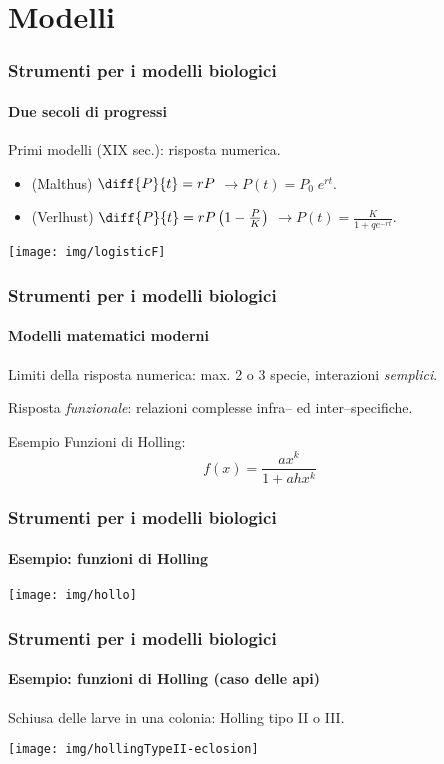 \documentclass[]{beamer}
\begin{document}
\section{Modelli}
\begin{frame}
    \frametitle{Strumenti per i modelli biologici}
    \framesubtitle{Due secoli di progressi}

    Primi modelli (XIX sec.): risposta numerica.
    \begin{itemize}
        \item (Malthus) $\diff{P}{t} = rP$ \pause \quad $\rightarrow P(t) = P_0 \; e^{rt}$.
        \item (Verlhust) $\diff{P}{t} = rP \left( 1 - \frac{P}{K} \right)$
            \pause \quad $\rightarrow P(t) = \frac{K}{1+qe^{-rt}}$.
    \end{itemize}

    \pause
    \begin{center}
        \texttt{[image: img/logisticF]}
    \end{center}
\end{frame}


\begin{frame}
    \frametitle{Strumenti per i modelli biologici}
    \framesubtitle{Modelli matematici moderni}

    Limiti della risposta numerica: max. 2 o 3 specie, interazioni \emph{semplici}.

    \pause
    Risposta \emph{funzionale}: relazioni complesse infra-- ed inter--specifiche.

    \pause
    \begin{exampleblock}{Esempio}
        Funzioni di Holling: $$f(x) = \frac{a x^k}{1 + a h x^k}$$
    \end{exampleblock}
\end{frame}

\begin{frame}
    \frametitle{Strumenti per i modelli biologici}
    \framesubtitle{Esempio: funzioni di Holling}

    \begin{center}
        \texttt{[image: img/hollo]}
    \end{center}
\end{frame}

\begin{frame}
    \frametitle{Strumenti per i modelli biologici}
    \framesubtitle{Esempio: funzioni di Holling (caso delle api)}

    Schiusa delle larve in una colonia: Holling tipo II o III.
    \begin{center}
        \texttt{[image: img/hollingTypeII-eclosion]}
    \end{center}
\end{frame}
\end{document}

